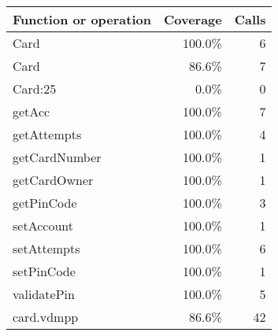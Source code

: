 \documentclass[a4paper]{article}
\begin{document}
\begin{longtable}{|l|r|r|}
\hline
Function or operation & Coverage & Calls \\
\hline
\hline
Card & 100.0\% & 6 \\
\hline
Card & 86.6\% & 7 \\
\hline
Card:25 & 0.0\% & 0 \\
\hline
getAcc & 100.0\% & 7 \\
\hline
getAttempts & 100.0\% & 4 \\
\hline
getCardNumber & 100.0\% & 1 \\
\hline
getCardOwner & 100.0\% & 1 \\
\hline
getPinCode & 100.0\% & 3 \\
\hline
setAccount & 100.0\% & 1 \\
\hline
setAttempts & 100.0\% & 6 \\
\hline
setPinCode & 100.0\% & 1 \\
\hline
validatePin & 100.0\% & 5 \\
\hline
\hline
card.vdmpp & 86.6\% & 42 \\
\hline
\end{longtable}
\end{document}
